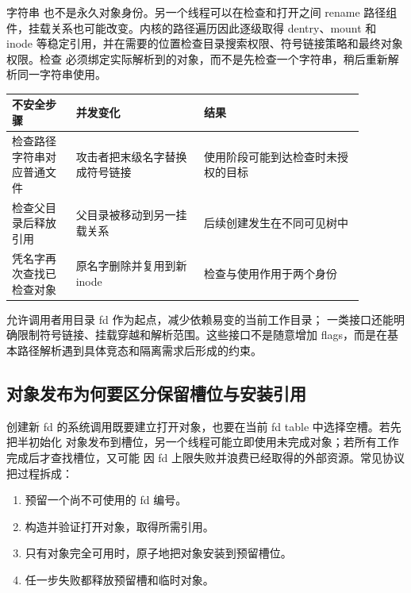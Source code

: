 字符串  也不是永久对象身份。另一个线程可以在检查和打开之间
rename 路径组件，挂载关系也可能改变。内核的路径遍历因此逐级取得 dentry、mount 和
inode 等稳定引用，并在需要的位置检查目录搜索权限、符号链接策略和最终对象权限。检查
必须绑定实际解析到的对象，而不是先检查一个字符串，稍后重新解析同一字符串使用。

\begin{longtable}{|L{0.16\linewidth}|L{0.32\linewidth}|L{0.40\linewidth}|}
\hline
不安全步骤 & 并发变化 & 结果 \\ \hline
检查路径字符串对应普通文件 & 攻击者把末级名字替换成符号链接 & 使用阶段可能到达检查时未授权的目标 \\ \hline
检查父目录后释放引用 & 父目录被移动到另一挂载关系 & 后续创建发生在不同可见树中 \\ \hline
凭名字再次查找已检查对象 & 原名字删除并复用到新 inode & 检查与使用作用于两个身份 \\ \hline
\end{longtable}

 允许调用者用目录 fd 作为起点，减少依赖易变的当前工作目录；
 一类接口还能明确限制符号链接、挂载穿越和解析范围。这些接口不是随意增加
flags，而是在基本路径解析遇到具体竞态和隔离需求后形成的约束。

\subsection{对象发布为何要区分保留槽位与安装引用}

创建新 fd 的系统调用既要建立打开对象，也要在当前 fd table 中选择空槽。若先把半初始化
对象发布到槽位，另一个线程可能立即使用未完成对象；若所有工作完成后才查找槽位，又可能
因 fd 上限失败并浪费已经取得的外部资源。常见协议把过程拆成：

\begin{enumerate}
\tightlist
\item 预留一个尚不可使用的 fd 编号。
\item 构造并验证打开对象，取得所需引用。
\item 只有对象完全可用时，原子地把对象安装到预留槽位。
\item 任一步失败都释放预留槽和临时对象。
\end{enumerate}

